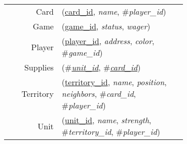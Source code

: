 
\usepackage[normalem]{ulem}
\newenvironment{mld}
  {\par\begin{minipage}{\linewidth}\begin{tabular}{rp{0.7\linewidth}}}
  {\end{tabular}\end{minipage}\par}
\newcommand{\relat}[1]{\textsc{#1}}
\newcommand{\attr}[1]{\emph{#1}}
\newcommand{\prim}[1]{\uline{#1}}
\newcommand{\foreign}[1]{\#\textsl{#1}}


\begin{mld}
  Card & (\prim{card\_id}, \attr{name}, \foreign{player\_id})\\
  Game & (\prim{game\_id}, \attr{status}, \attr{wager})\\
  Player & (\prim{player\_id}, \attr{address}, \attr{color}, \foreign{game\_id})\\
  Supplies & (\foreign{\prim{unit\_id}}, \foreign{\prim{card\_id}})\\
  Territory & (\prim{territory\_id}, \attr{name}, \attr{position}, \attr{neighbors}, \foreign{card\_id}, \foreign{player\_id})\\
  Unit & (\prim{unit\_id}, \attr{name}, \attr{strength}, \foreign{territory\_id}, \foreign{player\_id})\\
\end{mld}